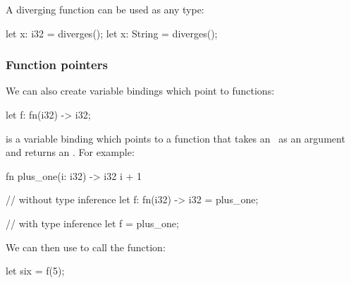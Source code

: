 A diverging function can be used as any type:

\begin{rustc}
let x: i32 = diverges();
let x: String = diverges();
\end{rustc}

\subsubsection*{Function pointers}

We can also create variable bindings which point to functions:

\begin{rustc}
let f: fn(i32) -> i32;
\end{rustc}

 is a variable binding which points to a function that takes an \itt\ as an argument and returns an \itt. 
For example:

\begin{rustc}
fn plus_one(i: i32) -> i32 {
    i + 1
}

// without type inference
let f: fn(i32) -> i32 = plus_one;

// with type inference
let f = plus_one;
\end{rustc}

We can then use  to call the function:

\begin{rustc}
let six = f(5);
\end{rustc}

